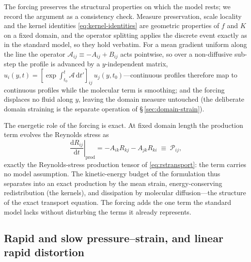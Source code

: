 \documentclass[lineno]{JFM-FLM_Au}
\begin{document}
The forcing preserves the structural properties on which the model
rests; we record the argument as a consistency check. Measure
preservation, scale locality and the kernel identities
\eqref{eq:kernel-identities} are geometric properties of $f$ and $K$
on a fixed domain, and the operator splitting applies the discrete
event exactly as in the standard model, so they hold verbatim. For a
mean gradient uniform along the line the operator
$\mathcal{A}_{ij}\equiv-A_{ij}+B_{ij}$ acts pointwise, so over a
non-diffusive sub-step the profile is advanced by a $y$-independent
matrix,
$u_i(y,t)=[\exp\!\int_{t_0}^{t}\mathcal{A}\,\mathrm{d}t']_{ij}\,
u_j(y,t_0)$---continuous profiles therefore map
to continuous profiles while the molecular term is smoothing; and the
forcing displaces no fluid along $y$, leaving the domain measure
untouched (the deliberate domain straining is the separate operation
of \S\,\ref{sec:domain-strain}).

The energetic role of the forcing is exact. At fixed domain length the
production term evolves the Reynolds stress as
\begin{equation}
  \left.\frac{\mathrm{d}R_{ij}}{\mathrm{d}t}\right|_{\text{prod}}
  = -A_{ik}R_{kj}-A_{jk}R_{ki}
  \;\equiv\; \mathcal{P}_{ij},
  \label{eq:production-rate}
\end{equation}
exactly the Reynolds-stress production tensor of \eqref{eq:rstransport}:
the term carries no model assumption. The kinetic-energy budget of the
formulation thus separates into an exact production by the mean strain,
energy-conserving redistribution (the kernels), and dissipation by
molecular diffusion---the structure of the exact transport equation. The
forcing adds the one term the standard model lacks without disturbing the
terms it already represents.

\subsection{Rapid and slow pressure--strain, and linear rapid
distortion}\label{sec:rapid-slow}
\end{document}
